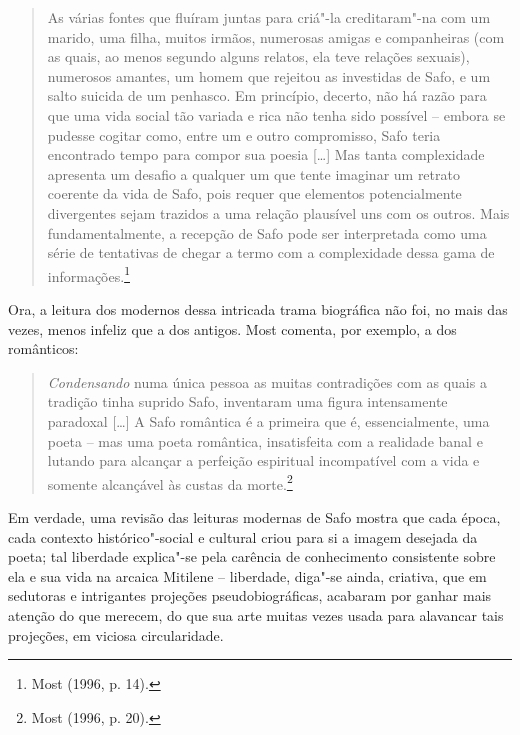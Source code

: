 \begin{quote}
As várias fontes que fluíram juntas para criá"-la creditaram"-na com um marido,
uma filha, muitos irmãos, numerosas amigas e companheiras (com as quais, ao
menos segundo alguns relatos, ela teve relações sexuais), numerosos amantes, um
homem que rejeitou as investidas de Safo, e um salto suicida de um penhasco. Em
princípio, decerto, não há razão para que uma vida social tão variada e rica
não tenha sido possível -- embora se pudesse cogitar como, entre um e outro
compromisso, Safo teria encontrado tempo para compor sua poesia [\ldots{}] Mas tanta
complexidade apresenta um desafio a qualquer um que tente imaginar um retrato
coerente da vida de Safo, pois requer que elementos potencialmente divergentes
sejam trazidos a uma relação plausível uns com os outros. Mais
fundamentalmente, a recepção de Safo pode ser interpretada como uma série de
tentativas de chegar a termo com a complexidade dessa gama de informações.\footnote{ Most (1996, p. 14).}
\end{quote}

Ora, a leitura dos modernos dessa intricada trama biográfica não foi, no mais
das vezes, menos infeliz que a dos antigos. Most comenta, por exemplo,
a dos românticos:

\begin{quote}
\textit{Condensando} numa única pessoa as muitas contradições com as quais a
tradição tinha suprido Safo, inventaram uma figura intensamente paradoxal
[\ldots{}] A Safo romântica é a primeira que é, essencialmente, uma poeta -- mas uma
poeta romântica, insatisfeita com a realidade banal e lutando para alcançar a
perfeição espiritual incompatível com a vida e somente alcançável às custas da
morte.\footnote{ Most (1996, p. 20).}
\end{quote}

Em verdade, uma revisão das leituras modernas de Safo mostra que cada época,
cada contexto histórico"-social e cultural criou para si a imagem desejada da
poeta; tal liberdade explica"-se pela carência de conhecimento consistente sobre
ela e sua vida na arcaica Mitilene -- liberdade, diga"-se ainda, criativa, que
em sedutoras e intrigantes projeções pseudobiográficas, acabaram por
ganhar mais atenção do que merecem, do que sua arte
muitas vezes usada para alavancar tais projeções, em viciosa circularidade. 

